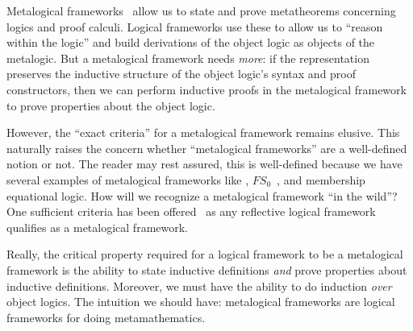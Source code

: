 \begin{node}
Metalogical frameworks~\cite{basin1991metalogical,basin2004reflective} allow us to state and prove metatheorems
concerning logics and proof calculi.
Logical frameworks use these to allow us to ``reason within the logic'' and
build derivations of the object logic as objects of the metalogic. But a
metalogical framework needs \emph{more}: if the representation
preserves the inductive structure of the object logic's syntax and
proof constructors, then we can perform inductive proofs in the
metalogical framework to prove properties about the object logic.

However, the ``exact criteria'' for a metalogical framework remains
elusive. This naturally raises the concern whether ``metalogical
frameworks'' are a well-defined notion or not. The reader may rest
assured, this is well-defined because we have several examples of metalogical frameworks
like \HOL, $FS_{0}$~\cite{matthews1992experience,matthews1993theory}, and membership equational logic. How will we
recognize a metalogical framework ``in the wild''? One sufficient
criteria has been offered~\cite{basin2004reflective} as any reflective
logical framework qualifies as a metalogical framework.

Really, the critical property required for a logical framework to be a
metalogical framework is the ability to state inductive definitions
\emph{and} prove properties about inductive definitions. Moreover, we
must have the ability to do induction \emph{over} object logics. The
intuition we should have: metalogical frameworks are logical
frameworks for doing metamathematics.
\end{node}


